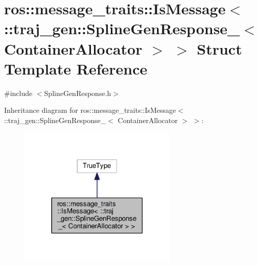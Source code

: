 \hypertarget{structros_1_1message__traits_1_1_is_message_3_01_1_1traj__gen_1_1_spline_gen_response___3_01_container_allocator_01_4_01_4}{}\section{ros\+:\+:message\+\_\+traits\+:\+:Is\+Message$<$ \+:\+:traj\+\_\+gen\+:\+:Spline\+Gen\+Response\+\_\+$<$ Container\+Allocator $>$ $>$ Struct Template Reference}
\label{structros_1_1message__traits_1_1_is_message_3_01_1_1traj__gen_1_1_spline_gen_response___3_01_container_allocator_01_4_01_4}


{\ttfamily \#include $<$Spline\+Gen\+Response.\+h$>$}



Inheritance diagram for ros\+:\+:message\+\_\+traits\+:\+:Is\+Message$<$ \+:\+:traj\+\_\+gen\+:\+:Spline\+Gen\+Response\+\_\+$<$ Container\+Allocator $>$ $>$\+:
\nopagebreak
\begin{figure}[H]
\begin{center}
\leavevmode
\includegraphics[width=213pt]{structros_1_1message__traits_1_1_is_message_3_01_1_1traj__gen_1_1_spline_gen_response___3_01_con0b1ad59be72ce1b41b7ec42710fd7e36}
\end{center}
\end{figure}


